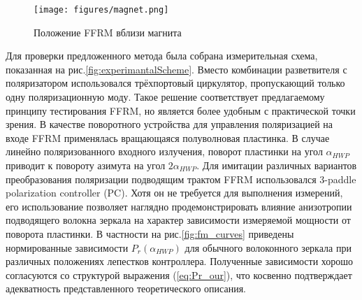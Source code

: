 \documentclass{article}
\begin{document}
\begin{figure}[b]
	\centering
	\texttt{[image: figures/magnet.png]}
	\caption{Положение FFRM вблизи магнита}
	\label{fig:magnet}
\end{figure}

Для проверки предложенного метода была собрана измерительная схема, показанная на рис.\ref{fig:experimantalScheme}.
Вместо комбинации разветвителя с поляризатором использовался трёхпортовый циркулятор, пропускающий только одну поляризационную моду.
Такое решение соответствует предлагаемому принципу тестирования FFRM, но является более удобным с практической точки зрения.
В качестве поворотного устройства для управления поляризацией на входе FFRM применялась вращающаяся полуволновая пластинка.
В случае линейно поляризованного входного излучения, поворот пластинки на угол $\alpha_{HWP}$ приводит к повороту азимута на угол $2\alpha_{HWP}$. 
Для имитации различных вариантов преобразования поляризации подводящим трактом FFRM использовался 3-paddle polarization controller (PC).
Хотя он не требуется для выполнения измерений, его использование позволяет наглядно продемонстрировать влияние анизотропии подводящего волокна зеркала на характер зависимости измеряемой мощности от поворота пластинки.
В частности на рис.\ref{fig:fm_curves} приведены нормированные зависимости $P_r(\alpha_{HWP})$ для обычного волоконного зеркала при различных положениях лепестков контроллера.
Полученные зависимости хорошо согласуются со структурой выражения (\ref{eq:Pr_our}), что косвенно подтверждает адекватность представленного теоретического описания.
\end{document}
